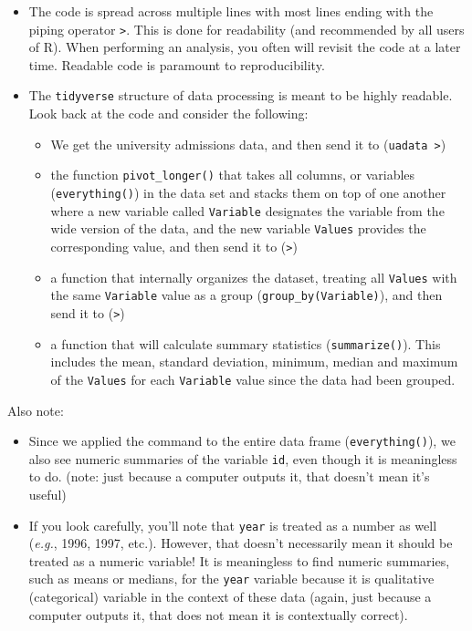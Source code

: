 \documentclass[
]{book}
\providecommand{\tightlist}{%
  \setlength{\itemsep}{0pt}\setlength{\parskip}{0pt}}
\begin{document}
\begin{itemize}
\tightlist
\item
  The code is spread across multiple lines with most lines ending with the piping operator \texttt{\textbar{}\textgreater{}}. This is done for readability (and recommended by all users of R). When performing an analysis, you often will revisit the code at a later time. Readable code is paramount to reproducibility.
\item
  The \texttt{tidyverse} structure of data processing is meant to be highly readable. Look back at the code and consider the following:

  \begin{itemize}
  \tightlist
  \item
    We get the university admissions data, and then send it to (\texttt{uadata\ \textbar{}\textgreater{}})
  \item
    the function \texttt{pivot\_longer()} that takes all columns, or variables (\texttt{everything()}) in the data set and stacks them on top of one another where a new variable called \texttt{Variable} designates the variable from the wide version of the data, and the new variable \texttt{Values} provides the corresponding value, and then send it to (\texttt{\textbar{}\textgreater{}})
  \item
    a function that internally organizes the dataset, treating all \texttt{Values} with the same \texttt{Variable} value as a group (\texttt{group\_by(Variable)}), and then send it to (\texttt{\textbar{}\textgreater{}})
  \item
    a function that will calculate summary statistics (\texttt{summarize()}). This includes the mean, standard deviation, minimum, median and maximum of the \texttt{Values} for each \texttt{Variable} value since the data had been grouped.
  \end{itemize}
\end{itemize}

Also note:

\begin{itemize}
\tightlist
\item
  Since we applied the command to the entire data frame (\texttt{everything()}), we also see numeric summaries of the variable \texttt{id}, even though it is meaningless to do. (note: just because a computer outputs it, that doesn't mean it's useful)
\item
  If you look carefully, you'll note that \texttt{year} is treated as a number as well (\emph{e.g.}, 1996, 1997, etc.). However, that doesn't necessarily mean it should be treated as a numeric variable! It is meaningless to find numeric summaries, such as means or medians, for the \texttt{year} variable because it is qualitative (categorical) variable in the context of these data (again, just because a computer outputs it, that does not mean it is contextually correct).
\end{itemize}
\end{document}
